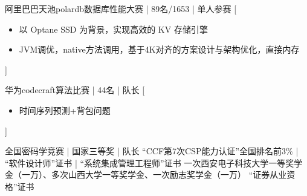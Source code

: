 \documentclass[zh]{resume}
\begin{document}
\begin{entries}
    {阿里巴巴天池polardb数据库性能大赛 | 89名/1653 | 单人参赛}%
    [\begin{itemize}
      \item{\icon{\faFlag}} 以 Optane SSD 为背景，实现高效的 KV 存储引擎
      \item{\icon{\faFlag}} JVM调优，native方法调用，基于4K对齐的方案设计与架构优化，直接内存
    \end{itemize}]%

    {华为codecraft算法比赛 | 44名 | 队长}%
    [\begin{itemize}
      \item{\icon{\faFlag}} 时间序列预测+背包问题\quad {}
    \end{itemize}]%

    {全国密码学竞赛 | 国家三等奖 | 队长 \quad {}}%
    {“CCF第7次CSP能力认证”全国排名前3\% | “软件设计师”证书 | “系统集成管理工程师”证书}
    {一次西安电子科技大学一等奖学金（一万）、多次山西大学一等奖学金、一次励志奖学金（一万）}
    {“证券从业资格”证书}
\end{entries}
\end{document}
